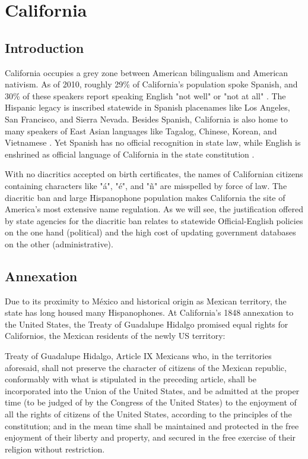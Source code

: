 \section{California}

\subsection{Introduction}

California occupies a grey zone between American bilingualism and American
nativism. As of 2010, roughly 29\% of California's population spoke Spanish, and
30\% of these speakers report speaking English "not well" or "not at all"
\parencite{acs-lang-states}. The Hispanic legacy is inscribed statewide in
Spanish placenames like Los Angeles, San Francisco, and Sierra Nevada. Besides
Spanish, California is also home to many speakers of East Asian languages like
Tagalog, Chinese, Korean, and Vietnamese \parencite{acs-lang-states}. Yet
Spanish has no official recognition in state law, while English is enshrined as
official language of California in the state constitution \parencite{ca-const}.

With no diacritics accepted on birth certificates, the names of Californian
citizens containing characters like "á", "é", and "ñ" are misspelled by force of
law. The diacritic ban and large Hispanophone population makes California the
site of America's most extensive name regulation. As we will see, the
justification offered by state agencies for the diacritic ban relates to
statewide Official-English policies on the one hand (political) and the high
cost of updating government databases on the other (administrative).

\subsection{Annexation}

Due to its proximity to México and historical origin as Mexican territory, the
state has long housed many Hispanophones. At California's 1848 annexation to the
United States, the Treaty of Guadalupe Hidalgo promised equal rights for
Californios, the Mexican residents of the newly US territory:

\begin{aquote}{Treaty of Guadalupe Hidalgo, Article IX}
	Mexicans who, in the territories aforesaid, shall not preserve the character
	of citizens of the Mexican republic, conformably with what is stipulated in
	the preceding article, shall be incorporated into the Union of the United
	States, and be admitted at the proper time (to be judged of by the Congress of
	the United States) to the enjoyment of all the rights of citizens of the
	United States, according to the principles of the constitution; and in the
	mean time shall be maintained and protected in the free enjoyment of their
	liberty and property, and secured in the free exercise of their religion
	without restriction. \parencite{guadalupe}
\end{aquote}

